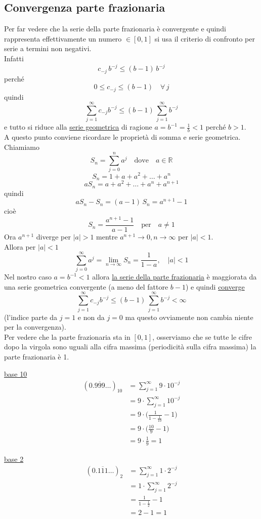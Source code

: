 \subsection{Convergenza parte frazionaria}
Per far vedere che la serie della parte frazionaria è convergente e quindi rappresenta effettivamente un numero $\in [0,1]$ si usa il criterio di confronto per serie a termini non negativi. \\
Infatti \[ c_{-j}\,b^{-j} \le (b-1)\,b^{-j} \]
perché \[ 0 \le c_{-j} \le (b-1) \quad \forall \, j \]
quindi \[ \sum_{j=1}^{\infty}c_{-j}b^{-j} \le (b-1)\,\sum_{j=1}^{\infty}b^{-j} \]
e tutto si riduce alla \uline{serie geometrica} di ragione $a = b^{-1} = \frac{1}{b} < 1$ perché $b > 1$.\\
A questo punto conviene ricordare le proprietà di somma e serie geometrica. 
Chiamiamo \[ S_n = \sum_{j=0}^{n}a^j \quad \text{dove} \quad a \in \mathbb{R} \]
\[ S_n = 1 + a + a^2 + \dotsc + a^n \]
\[ aS_n = a + a^2 + \dotsc + a^n + a^{n+1} \]
quindi \[ aS_n - S_n = (a - 1)\,S_n = a^{n+1} -1 \]
cioè \[ S_n = \frac{a^{n+1} - 1}{a - 1} \quad \text{per} \quad a \ne 1 \]
Ora $a^{n+1}$ diverge per $\lvert a\rvert > 1$ mentre $a^{n+1} \longrightarrow 0 , n \to \infty $ per $\lvert a\rvert < 1$.\\
Allora per $\lvert a\rvert < 1$
\[ \sum_{j=0}^{\infty}a^j = \lim_{n \to \infty} S_n = \frac{1}{1 - a} , \quad \lvert a\rvert < 1 \]
Nel nostro caso $a = b^{-1} < 1$ allora \uline{la serie della parte frazionaria} è maggiorata da una serie geometrica convergente (a meno del fattore $b-1$) e quindi \uline{converge}
\[ \sum_{j=1}^{\infty}c_{-j}b^{-j} \le (b-1)\,\sum_{j=1}^{\infty}b^{-j} < \infty \]
(l'indice parte da $j = 1$ e non da $j = 0$ ma questo ovviamente non cambia niente per la convergenza). \\
Per vedere che la parte frazionaria sta in $[0,1]$, osserviamo che se tutte le cifre dopo la virgola sono uguali alla cifra massima (periodicità sulla cifra massima) la parte frazionaria è 1.

\begin{esempio}
\uline{base 10}
\[ \begin{split}
    (0.\overline{999} \dotsc)_{10} & = \sum_{j=1}^{\infty} 9 \cdot 10^{-j} \\
    & = 9 \cdot \sum_{j=1}^{\infty} 10^{-j} \\
    & = 9 \cdot \biggl( \frac{1}{1 - \frac{1}{10}} - 1 \biggr) \\
    & = 9 \cdot \biggl( \frac{10}{9} - 1 \biggr) \\
    & = 9 \cdot \frac{1}{9} = 1
\end{split} \]
\end{esempio}
\begin{esempio}
\uline{base 2}
\[ \begin{split}
    (0.\overline{111} \dotsc)_{2} & = \sum_{j=1}^{\infty} 1 \cdot 2^{-j} \\
    & = 1 \cdot \sum_{j=1}^{\infty} 2^{-j} \\
    & = \frac{1}{1 - \frac{1}{2}} - 1 \\
    & = 2 - 1 = 1
\end{split} \]
\end{esempio}

